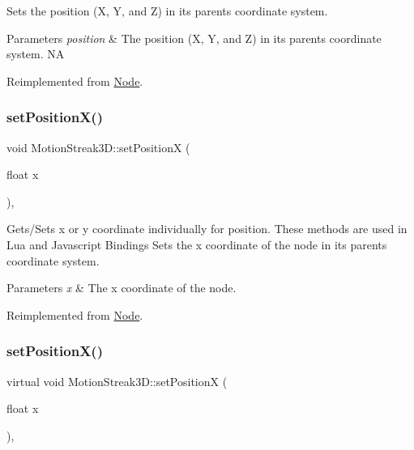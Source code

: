 Sets the position (X, Y, and Z) in its parent\textquotesingle{}s coordinate system.


\begin{DoxyParams}{Parameters}
{\em position} & The position (X, Y, and Z) in its parent\textquotesingle{}s coordinate system.  NA \\
\hline
\end{DoxyParams}


Reimplemented from \hyperlink{classNode_aa9eee02836d359b1469cf8a1484b485f}{Node}.

\mbox{\label{classMotionStreak3D_a9c363f74a20d8b5e83357343ecfad7d4}} 
\subsubsection{\texorpdfstring{set\+Position\+X()}{setPositionX()}\hspace{0.1cm}{\footnotesize\ttfamily [1/2]}}
{\footnotesize\ttfamily void Motion\+Streak3\+D\+::set\+PositionX (\begin{DoxyParamCaption}\item[{float}]{x }\end{DoxyParamCaption})\hspace{0.3cm}{\ttfamily [override]}, {\ttfamily [virtual]}}

Gets/\+Sets x or y coordinate individually for position. These methods are used in Lua and Javascript Bindings Sets the x coordinate of the node in its parent\textquotesingle{}s coordinate system.


\begin{DoxyParams}{Parameters}
{\em x} & The x coordinate of the node. \\
\hline
\end{DoxyParams}


Reimplemented from \hyperlink{classNode_ae1dfc73d6122a95778d5d9db3d1fd913}{Node}.

\mbox{\label{classMotionStreak3D_a1b723a27b44aa12ced168fe18ca920de}} 
\subsubsection{\texorpdfstring{set\+Position\+X()}{setPositionX()}\hspace{0.1cm}{\footnotesize\ttfamily [2/2]}}
{\footnotesize\ttfamily virtual void Motion\+Streak3\+D\+::set\+PositionX (\begin{DoxyParamCaption}\item[{float}]{x }\end{DoxyParamCaption})\hspace{0.3cm}{\ttfamily [override]}, {\ttfamily [virtual]}}

